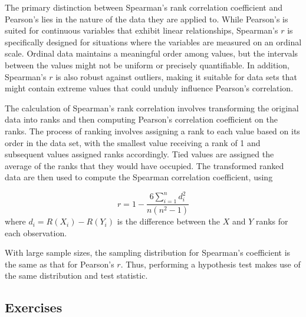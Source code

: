 \documentclass{article}
\begin{document}
The primary distinction between Spearman's rank correlation coefficient and Pearson's lies in the nature of the data they are applied to. While Pearson's is suited for continuous variables that exhibit linear relationships, Spearman's $r$ is specifically designed for situations where the variables are measured on an ordinal scale. Ordinal data maintains a meaningful order among values, but the intervals between the values might not be uniform or precisely quantifiable. In addition, Spearman's $r$ is also robust against outliers, making it suitable for data sets that might contain extreme values that could unduly influence Pearson's correlation.

The calculation of Spearman's rank correlation involves transforming the original data into ranks and then computing Pearson's correlation coefficient on the ranks. The process of ranking involves assigning a rank to each value based on its order in the data set, with the smallest value receiving a rank of 1 and subsequent values assigned ranks accordingly. Tied values are assigned the average of the ranks that they would have occupied. The transformed ranked data are then used to compute the Spearman correlation coefficient, using

$$
r = 1 - \frac{6 \sum^{n}_{i=1}{d^2_i}}{n(n^2-1)}
$$
where $d_i = R(X_i) - R(Y_i)$ is the difference between the $X$ and $Y$ ranks for each observation.

With large sample sizes, the sampling distribution for Spearman's coefficient is the same as that for Pearson's $r$. Thus, performing a hypothesis test makes use of the same distribution and test statistic.

\subsection{Exercises}
\end{document}
